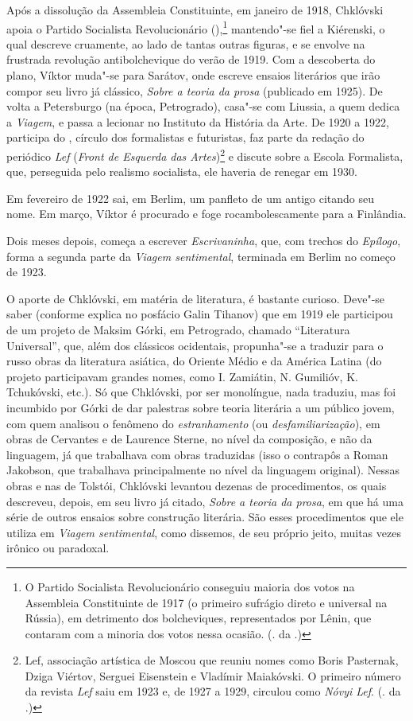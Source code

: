 Após a dissolução da Assembleia Constituinte, em janeiro de 1918,
Chklóvski apoia o Partido Socialista Revolucionário (),\footnote{O Partido Socialista Revolucionário conseguiu maioria dos votos na Assembleia Constituinte de 1917 (o primeiro sufrágio direto e universal na Rússia), em detrimento dos bolcheviques, representados por Lênin, que contaram com a minoria dos votos nessa ocasião. (. da .)}
mantendo"-se fiel a Kiérenski, o qual descreve cruamente, ao lado
de tantas outras figuras, e se envolve na frustrada revolução
antibolchevique do verão de 1919. Com a descoberta do plano,
Víktor muda"-se para Sarátov, onde escreve ensaios literários
que irão compor seu livro já clássico, \emph{Sobre a teoria da
prosa} (publicado em 1925). De volta a Petersburgo (na época,
Petrogrado), casa"-se com Liussia, a quem dedica a \emph{Viagem},
e passa a lecionar no Instituto da História da Arte. De
1920 a 1922, participa do , círculo dos formalistas
e futuristas, faz parte da redação do periódico \emph{Lef}
(\emph{Front de Esquerda das Artes})\footnote{Lef, associação artística de
Moscou que reuniu nomes como Boris Pasternak, Dziga Viértov,
Serguei Eisenstein e Vladímir Maiakóvski. O primeiro número da
revista \emph{Lef} saiu em 1923 e, de 1927 a 1929, circulou como
\emph{Nóvyi Lef}. (. da .)} e discute sobre a Escola
Formalista, que, perseguida pelo realismo socialista, ele haveria
de renegar em 1930.

Em fevereiro de 1922 sai, em Berlim, um panfleto de um antigo
 citando seu nome. Em março, Víktor é procurado e
foge rocambolescamente para a Finlândia.

Dois meses depois, começa a escrever \emph{Escrivaninha}, que,
com trechos do \emph{Epílogo}, forma a segunda parte da
\emph{Viagem sentimental}, terminada em Berlim no começo de 1923.

O aporte de Chklóvski, em matéria de literatura, é bastante
curioso. Deve"-se saber (conforme explica no posfácio Galin
Tihanov) que em 1919 ele participou de um projeto de Maksim
Górki, em Petrogrado, chamado ``Literatura
Universal'', que, além dos clássicos ocidentais, propunha"-se
a traduzir para o russo obras da literatura asiática, do Oriente
Médio e da América Latina (do projeto participavam grandes nomes,
como I. Zamiátin, N. Gumilióv, K. Tchukóvski, etc.). Só que
Chklóvski, por ser monolíngue, nada traduziu, mas foi incumbido
por Górki de dar palestras sobre teoria literária a um público
jovem, com quem analisou o fenômeno do \emph{estranhamento}
(ou \emph{desfamiliarização}), em obras de Cervantes e de
Laurence Sterne, no nível da composição, e não da linguagem,
já que trabalhava com obras traduzidas (isso o contrapôs a
Roman Jakobson, que trabalhava principalmente no nível da
linguagem original). Nessas obras e nas de Tolstói, Chklóvski
levantou dezenas de procedimentos, os quais descreveu, depois,
em seu livro já citado, \emph{Sobre a teoria da prosa}, em que
há uma série de outros ensaios sobre construção literária. São
esses procedimentos que ele utiliza em \emph{Viagem sentimental},
como dissemos, de seu próprio jeito, muitas vezes irônico
ou paradoxal.

